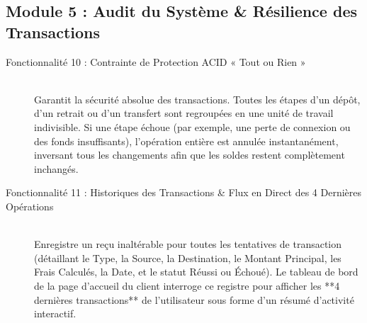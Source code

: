 \documentclass[12pt,a4paper]{article}
\begin{document}
	\subsection{Module 5 : Audit du Système \& Résilience des Transactions}
	\begin{description}
		\item[Fonctionnalité 10 : Contrainte de Protection ACID « Tout ou Rien »] ~\\
		Garantit la sécurité absolue des transactions. Toutes les étapes d'un dépôt, d'un retrait ou d'un transfert sont regroupées en une unité de travail indivisible. Si une étape échoue (par exemple, une perte de connexion ou des fonds insuffisants), l'opération entière est annulée instantanément, inversant tous les changements afin que les soldes restent complètement inchangés.
		
		\item[Fonctionnalité 11 : Historiques des Transactions \& Flux en Direct des 4 Dernières Opérations] ~\\
		Enregistre un reçu inaltérable pour toutes les tentatives de transaction (détaillant le Type, la Source, la Destination, le Montant Principal, les Frais Calculés, la Date, et le statut Réussi ou Échoué). Le tableau de bord de la page d'accueil du client interroge ce registre pour afficher les **4 dernières transactions** de l'utilisateur sous forme d'un résumé d'activité interactif.
	\end{description}
	
\end{document}
